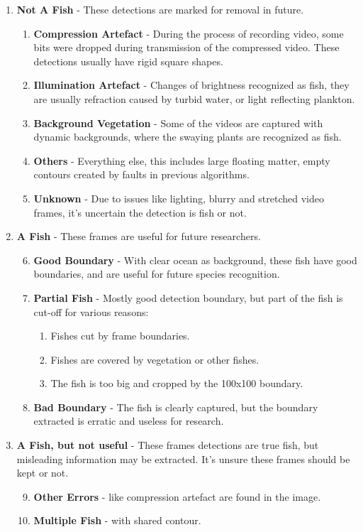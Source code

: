 \documentclass[bsc,frontabs,twoside,fullspacing,parskip,deptreport]{infthesis}
\begin{document}
\begin{enumerate}
   \setlength{\parskip}{3pt}

 \item \textbf{Not A Fish} - These detections are marked for removal in future.
 \begin{enumerate}
   \item \textbf{Compression Artefact} - During the process of recording video, some bits were dropped during transmission of the compressed video. These detections usually have rigid square shapes.
   \item \textbf{Illumination Artefact} - Changes of brightness recognized as fish, they are usually refraction caused by turbid water, or light reflecting plankton.
   \item \textbf{Background Vegetation} - Some of the videos are captured with dynamic backgrounds, where the swaying plants are recognized as fish.
   \item \textbf{Others} - Everything else, this includes large floating matter, empty contours created by faults in previous algorithms.
   \item \textbf{Unknown} - Due to issues like lighting, blurry and stretched video frames, it's uncertain the detection is fish or not.
 \end{enumerate}
 
 \item \textbf{A Fish} - These frames are useful for future researchers.
 \begin{enumerate}
   \setcounter{enumii}{5} 
   \item \textbf{Good Boundary} - With clear ocean as background, these fish have good boundaries, and are useful for future species recognition.
   \item \textbf{Partial Fish} - Mostly good detection boundary, but part of the fish is cut-off for various reasons:
    \begin{enumerate}
      \item Fishes cut by frame boundaries.
      \item Fishes are covered by vegetation or other fishes.
      \item The fish is too big and cropped by the 100x100 boundary.
    \end{enumerate}
   \item \textbf{Bad Boundary} - The fish is clearly captured, but the boundary extracted is erratic and useless for research. 
 \end{enumerate}
 
 \item \textbf{A Fish, but not useful} - These frames detections are true fish, but misleading information may be extracted. It's unsure these frames should be kept or not.
 \begin{enumerate}
   \setcounter{enumii}{8} 
   \item \textbf{Other Errors} - like compression artefact are found in the image.
   \item \textbf{Multiple Fish} - with shared contour.
 \end{enumerate}
\end{enumerate}
\end{document}
